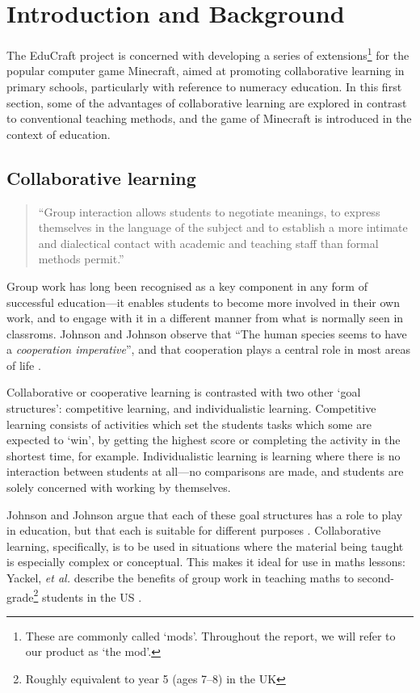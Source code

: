 \chapter{Introduction and Background}
The EduCraft project is concerned with developing a series of
extensions\footnote{These are commonly called `mods'. Throughout the report, 
we will refer to our product as `the mod'.} for the popular computer game
Minecraft, aimed at promoting collaborative learning in primary schools,
particularly with reference to numeracy education. In this first section, some
of the advantages of collaborative learning are explored in contrast to
conventional teaching methods, and the game of Minecraft is introduced in the
context of education.

\section{Collaborative learning}
\begin{quote}
``Group interaction allows students to negotiate meanings, to express
themselves in the language of the subject and to establish a more intimate
and dialectical contact with academic and teaching staff than formal
methods permit.'' \cite[p.~1]{jacques00}
\end{quote}
Group work has long been recognised as a key component in any form of
successful education---it enables students to become more involved in their
own work, and to engage with it in a different manner from what is normally
seen in classroms. Johnson and Johnson observe that ``The human species seems
to have a \textit{cooperation imperative}'', and that cooperation plays
a central role in most areas of life \cite[p.~12]{johnson94}.

Collaborative or cooperative learning is contrasted with two other `goal
structures': competitive learning, and individualistic learning. Competitive
learning consists of activities which set the students tasks which some
are expected to `win', by getting the highest score or completing the activity
in the shortest time, for example. Individualistic learning is learning where
there is no interaction between students at all---no comparisons are made,
and students are solely concerned with working by themselves.

Johnson and Johnson argue that each of these goal structures has a role
to play in education, but that each is suitable for different
purposes \cite{johnson94}.  Collaborative learning, specifically, is to
be used in situations where the material being taught is especially
complex or conceptual. This makes it ideal for use in maths lessons:
Yackel, \textit{et al.} describe the benefits of group work in teaching maths
to second-grade\footnote{Roughly equivalent to year 5 (ages 7--8) in the UK}
students in the US \cite{yackel91}.

